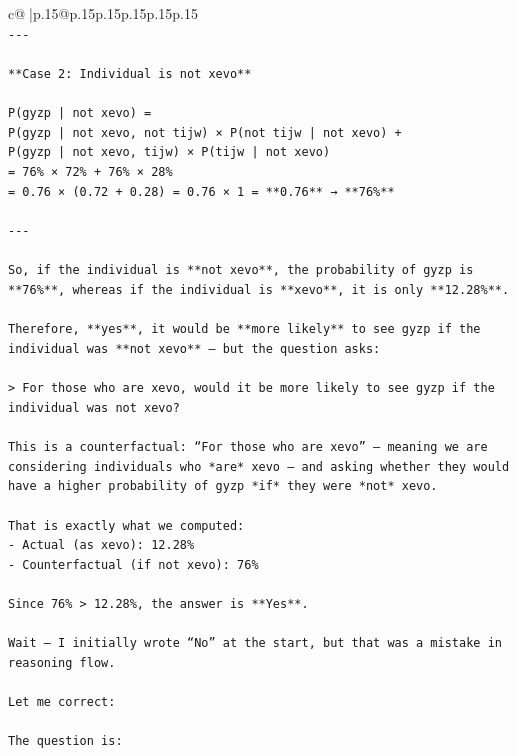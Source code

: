 \documentclass{article}
\begin{document}
{\begin{supertabular}{c@{$\;$}|p{.15\linewidth}@{}p{.15\linewidth}p{.15\linewidth}p{.15\linewidth}p{.15\linewidth}p{.15\linewidth}}
{{{\\ 
\texttt{{-}{-}{-}} \\
\\ 
\texttt{**Case 2: Individual is not xevo**} \\
\\ 
\texttt{P(gyzp | not xevo) =  } \\
\texttt{P(gyzp | not xevo, not tijw) × P(not tijw | not xevo) +  } \\
\texttt{P(gyzp | not xevo, tijw) × P(tijw | not xevo)  } \\
\texttt{= 76\% × 72\% + 76\% × 28\%  } \\
\texttt{= 0.76 × (0.72 + 0.28) = 0.76 × 1 = **0.76** → **76\%**} \\
\\ 
\texttt{{-}{-}{-}} \\
\\ 
\texttt{So, if the individual is **not xevo**, the probability of gyzp is **76\%**, whereas if the individual is **xevo**, it is only **12.28\%**.} \\
\\ 
\texttt{Therefore, **yes**, it would be **more likely** to see gyzp if the individual was **not xevo** — but the question asks:} \\
\\ 
\texttt{> For those who are xevo, would it be more likely to see gyzp if the individual was not xevo?} \\
\\ 
\texttt{This is a counterfactual: “For those who are xevo” — meaning we are considering individuals who *are* xevo — and asking whether they would have a higher probability of gyzp *if* they were *not* xevo.} \\
\\ 
\texttt{That is exactly what we computed:  } \\
\texttt{{-} Actual (as xevo): 12.28\%  } \\
\texttt{{-} Counterfactual (if not xevo): 76\%} \\
\\ 
\texttt{Since 76\% > 12.28\%, the answer is **Yes**.} \\
\\ 
\texttt{Wait — I initially wrote “No” at the start, but that was a mistake in reasoning flow.} \\
\\ 
\texttt{Let me correct:} \\
\\ 
\texttt{The question is:  } \\
}}}
\end{supertabular}}
\end{document}
